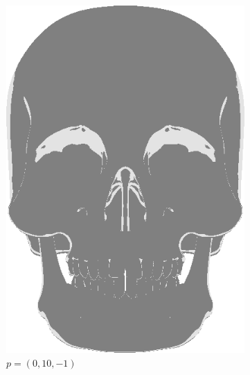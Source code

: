 \begin{figure}[h]
\begin{subfigure}[b]{0.25\textwidth}
        \includegraphics[width=\textwidth]{img/Lighting/Directional(10,-1).png}
        \caption{$p = (0,10,-1)$}
        \label{fig:LightingPosDir2}
    \end{subfigure}
~
\hspace{24pt}
~
    \begin{subfigure}[b]{0.25\textwidth}

\end{subfigure}
\end{figure}
